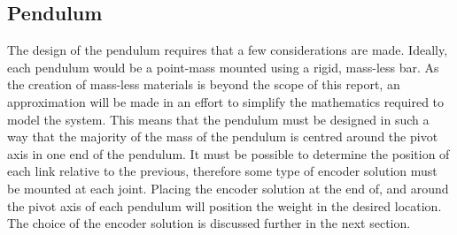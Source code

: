 \subsection{Pendulum} %
\label{sub:pendulum}
The design of the pendulum requires that a few considerations are made.
Ideally, each pendulum would be a point-mass mounted using a rigid, mass-less bar.
As the creation of mass-less materials is beyond the scope of this report, an approximation will be made in an effort to simplify the mathematics required to model the system.
This means that the pendulum must be designed in such a way that the majority of the mass of the pendulum is centred around the pivot axis in one end of the pendulum.
It must be possible to determine the position of each link relative to the previous, therefore some type of encoder solution must be mounted at each joint.
Placing the encoder solution at the end of, and around the pivot axis of each pendulum will position the weight in the desired location.
The choice of the encoder solution is discussed further in the next section.

